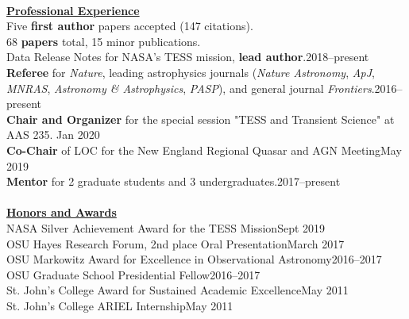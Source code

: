 \documentclass[letterpaper,11pt]{article}
\newcommand{\award}[2]{#1\hfill#2}
\begin{document}
\\
\noindent\underline{\textbf{Professional Experience}}\\ 
 Five \textbf{first author} papers accepted (147 citations). \\
 68 \textbf{papers} total,  15 minor publications.\\ %
 Data Release Notes for NASA's TESS mission, \textbf{lead author}.\hfill 2018--present\\
\textbf{Referee} for \textit{Nature}, leading astrophysics journals (\textit{Nature Astronomy}, \textit{ApJ},\\ 
\indent \textit{MNRAS}, \textit{Astronomy \& Astrophysics}, \textit{PASP}), and
   general journal \textit{Frontiers}.\hfill 2016--present\\%
 \textbf{Chair and Organizer} for the special session "TESS and Transient Science" at  AAS 235. \hfill Jan 2020\\
  \textbf{Co-Chair} of LOC for the New England Regional Quasar and AGN Meeting\hfill May 2019\\
   \textbf{Mentor} for 2 graduate students and 3 undergraduates.\hfill 2017--present\\
\\
\noindent\underline{\textbf{Honors and Awards}}\\
\award{NASA Silver Achievement Award for the TESS Mission}{Sept 2019}\\
\award{OSU Hayes Research Forum, 2nd place Oral Presentation}{March 2017} \\
\award{OSU Markowitz Award for Excellence in Observational Astronomy}{2016--2017}\\
\award{OSU Graduate School Presidential Fellow}{2016--2017}\\
\award{St. John's College Award for Sustained Academic Excellence}{May 2011}\\
\award{St. John's College ARIEL Internship}{May 2011}\\
\\
\end{document}
